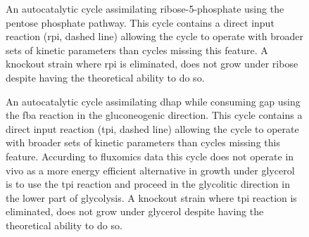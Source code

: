 \begin{figure}[h!]
    \centering{
        }
\caption{
    \label{fig:extrasamps1}
    An autocatalytic cycle assimilating ribose-5-phosphate using the pentose phosphate pathway.
    This cycle contains a direct input reaction (rpi, dashed line) allowing the cycle to operate with broader sets of kinetic parameters than cycles missing this feature.
    A knockout strain where rpi is eliminated, does not grow under ribose despite having the theoretical ability to do so.
}
\end{figure}
\begin{figure}[h!]
    \centering{
        }
\caption{
    \label{fig:extrasamps2}
    An autocatalytic cycle assimilating dhap while consuming gap using the fba reaction in the gluconeogenic direction.
    This cycle contains a direct input reaction (tpi, dashed line) allowing the cycle to operate with broader sets of kinetic parameters than cycles missing this feature.
    Accurding to fluxomics data this cycle does not operate in vivo as a more energy efficient alternative in growth under glycerol is to use the tpi reaction and proceed in the glycolitic direction in the lower part of glycolysis.
    A knockout strain where tpi reaction is eliminated, does not grow under glycerol despite having the theoretical ability to do so.
}
\end{figure}
 

